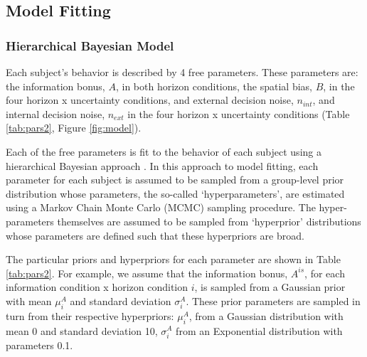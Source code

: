 \documentclass[12pt]{article}
\begin{document}
	\subsection*{Model Fitting}
	\subsubsection*{Hierarchical Bayesian Model}
	Each subject's behavior is described by 4 free parameters. These parameters are: the information bonus, $A$, in both horizon conditions, the spatial bias, $B$, in the four horizon x uncertainty conditions, and external decision noise, $n_{int}$, and internal decision noise, $n_{ext}$ in the four horizon x uncertainty conditions (Table \ref{tab:pars2}, Figure \ref{fig:model}). 
	
	Each of the free parameters is fit to the behavior of each subject using a hierarchical Bayesian approach \cite{}.  In this approach to model fitting, each parameter for each subject is assumed to be sampled from a group-level prior distribution whose parameters, the so-called `hyperparameters', are estimated using a Markov Chain Monte Carlo (MCMC) sampling procedure. The hyper-parameters themselves are assumed to be sampled from `hyperprior' distributions whose parameters are defined such that these hyperpriors are broad.  
	
	The particular priors and hyperpriors for each parameter are shown in Table \ref{tab:pars2}. For example, we assume that the information bonus, $A^{is}$, for each information condition x horizon condition $i$, is sampled from a Gaussian prior with mean $\mu^{A}_{i}$ and standard deviation $\sigma_{i}^A$. These prior parameters are sampled in turn from  their respective hyperpriors: $\mu_{i}^{A}$, from a Gaussian distribution with mean 0 and standard deviation 10, $\sigma_{i}^A$ from an Exponential distribution with parameters 0.1.
	
\end{document}
